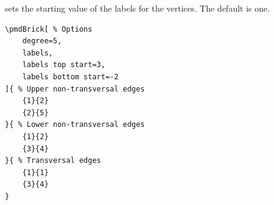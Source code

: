 \documentclass{ltxdoc}
\begin{document}
sets the starting value of the labels for the vertices. The default is one.
\begin{center}
    \begin{minipage}{\dimexpr0.85\textwidth-2\fboxrule-2\fboxsep\relax}
        \begin{minipage}[c]{0.4\linewidth}
\begin{verbatim}
\pmdBrick[ % Options
    degree=5,
    labels,
    labels top start=3,
    labels bottom start=-2
]{ % Upper non-transversal edges
    {1}{2}
    {2}{5}
}{ % Lower non-transversal edges
    {1}{2}
    {3}{4}
}{ % Transversal edges
    {1}{1}
    {3}{4}
}
\end{verbatim}
        \end{minipage}
        \hfill
        \begin{minipage}[c]{0.4\linewidth}
        \end{minipage}
    \end{minipage}%
\end{center}
\end{document}
